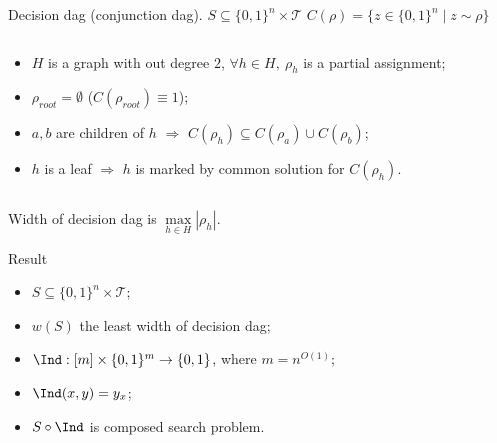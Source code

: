 \begin{frame}{Decision dag (conjunction dag). $S \subseteq \{0, 1\}^n \times \mathcal{T}$}
    $C(\rho) = \{z \in \{0, 1\}^n \mid z \sim \rho\}$
    
    \begin{columns}[t]
        \begin{column}{0.55\textwidth}
            \begin{itemize}
                \item $H$ is a graph with out degree $2$, $\forall h \in H, ~ {\rho}_h$ is a partial
                    assignment;
                \item $\rho_{root} = \emptyset$ ($C(\rho_{root}) \equiv 1$);
                \item $a, b$ are children of $h$ $\Rightarrow$ $C(\rho_{h}) \subseteq C(\rho_a) \cup
                    C(\rho_b)$;
                \item $h$ is a leaf $\Rightarrow$ $h$ is marked by common solution for $C(\rho_h)$.
            \end{itemize}
        \end{column}

		\begin{column}{0.4\textwidth}
            \begin{center}
                
            \end{center}
		\end{column}
	\end{columns}

    Width of decision dag is $\max\limits_{h \in H} |\rho_h|$.
\end{frame}

\begin{frame}{Result}
    \begin{itemize}
        \item $S \subseteq \{0, 1\}^n \times \mathcal{T}$;
        \item $w(S)$ the least width of decision dag;
        \pause
        \item $\Ind: [m] \times \{0, 1\}^m \to \{0, 1\}$, where $m = n^{O(1)}$;
        \item $\Ind(x, y) = y_x$;
        \pause
        \item $S \circ \Ind$ is composed search problem.
    \end{itemize}


\end{frame}